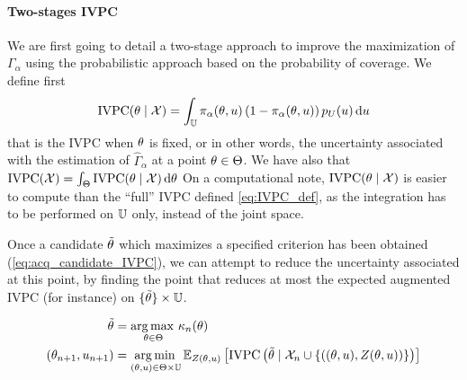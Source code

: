 \documentclass[../../Main_ManuscritThese.tex]{subfiles}
\begin{document}
\paragraph{Two-stages IVPC}
We are first going to detail a two-stage approach to improve the maximization of $\Gamma_\alpha$ using the probabilistic approach based on the probability of coverage.
We define first 
\begin{equation}
  \mathrm{IVPC}(\theta\mid \mathcal{X}) = \int_{\mathbb{U}} \pi_{\alpha}(\theta, u)\left(1 - \pi_{\alpha}(\theta, u)\right)p_{U}(u)\, \mathrm{d}u
\end{equation}
that is the $\mathrm{IVPC}$ when $\theta$ is fixed, or in other words, the uncertainty associated with the estimation of $\hat{\Gamma}_{\alpha}$ at a point $\theta \in \Theta$. We have also that $\mathrm{IVPC}(\mathcal{X}) = \int_{\Theta} \mathrm{IVPC}(\theta \mid \mathcal{X}) \,\mathrm{d}\theta$
On a computational note,  $\mathrm{IVPC}(\theta\mid \mathcal{X})$ is easier to compute than the ``full'' $\mathrm{IVPC}$ defined \cref{eq:IVPC_def}, as the integration has to be performed on $\mathbb{U}$ only, instead of the joint space.


Once a candidate $\tilde{\theta}$  which maximizes a specified criterion has been obtained (\cref{eq:acq_candidate_IVPC}), we can attempt to reduce the uncertainty associated at this point, by finding the point that reduces at most the expected augmented IVPC (for instance) on $\{\tilde{\theta}\}\times \mathbb{U}$.

\begin{align}
  \tilde{\theta} &= \operatorname*{arg\,max \,}_{\theta\in \Theta} \kappa_n(\theta) \label{eq:acq_candidate_IVPC}\\
  (\theta_{n+1}, u_{n+1}) & = \operatorname*{arg\,min \,}_{(\theta,u) \in \Theta \times \mathbb{U}} \mathbb{E}_{Z(\theta, u)}\left[ \mathrm{IVPC}\left(\tilde{\theta} \mid \mathcal{X}_n \cup\left\{\left((\theta,u), Z(\theta, u)\right)\right\} \right)  \right]
\end{align}


  
\end{document}
